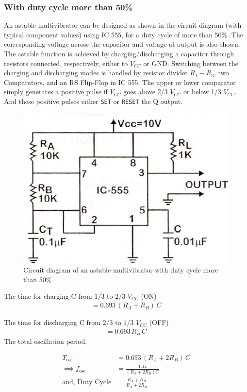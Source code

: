 \subsubsection{With duty cycle more than 50\%}
An astable
multivibrator can be designed as shown in the circuit diagram (with typical component
values) using IC 555, for a duty cycle of more than 50\%. The corresponding voltage
across the capacitor and voltage at output is also shown. The astable function is achieved
by charging/discharging a capacitor through resistors connected, respectively, either to
$V_{CC}$ or GND. Switching between the charging and discharging modes is handled by
resistor divider $R_1-R_3$, two Comparators, and an RS Flip-Flop in IC 555. The upper or
lower comparator simply generates a positive pulse if $V_{CC}$ goes above 2/3 $V_{CC}$ or below
1/3 $V_{CC}$. And these positive pulses either \verb|SET| or \verb|RESET| the Q output.

\begin{figure}[H]
    \centering
    \includegraphics[width=0.7\columnwidth]{images/ast.png}
    \caption{Circuit diagram of an astable multivibrator with duty cycle more than 50\%}
    \label{ast}
\end{figure}

\noindent The time for charging C from $1/3$ to $2/3$ $V_{CC}$ (ON) 
\begin{align*}
    = 0.693\,(R_A+R_B)\,C
\end{align*}

The time for discharging C from $2/3$ to $1/3$ $V_{CC}$ (OFF)
\begin{align*}
    = 0.693\,R_B\,C
\end{align*}    
The total oscillation period,

\begin{align}
    T_\text{osc} &= 0.693\,(R_A+2R_B)\,C \nonumber\\
    \implies f_\text{osc} &= \frac{1.44}{(R_A+2R_B)C}\\
    \text{and, Duty Cycle} &= \frac{R_A+R_B}{R_A+2R_B}
\end{align}

